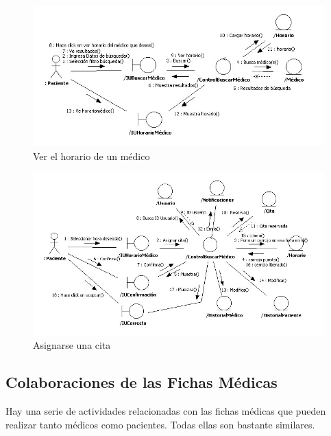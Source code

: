 \documentclass[a4paper,oneside,11pt]{book}
\begin{document}
			\begin{figure}[H]
			  \centering
			    \includegraphics[width=16cm]{img/jpg/colaboraciones/30_VerhoarioMedico.jpg}
			  \caption{Ver el horario de un médico}
			  \label{fig:col_verhorario_paciente}
			\end{figure}
			
			\begin{figure}[H]
			  \centering
			    \includegraphics[width=16cm]{img/jpg/colaboraciones/31_AsignarseCita.jpg}
			  \caption{Asignarse una cita}
			  \label{fig:col_asigcita_paciente}
			\end{figure}
			
			
	
		\newpage
		\subsection{Colaboraciones de las Fichas Médicas} %
		\label{sub:colaboraciones_de_las_fichas_medicas}
		
			Hay una serie de actividades relacionadas con las fichas médicas que pueden realizar tanto médicos como pacientes. Todas ellas son bastante similares.
			
\end{document}
